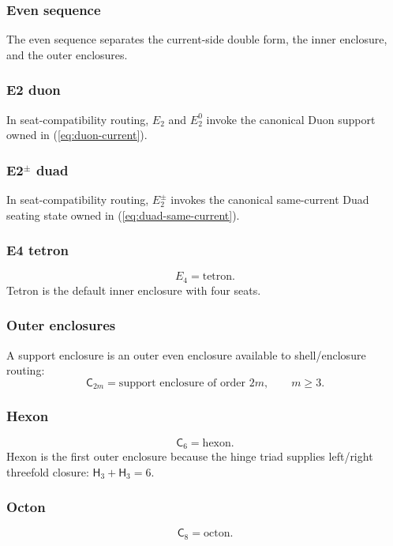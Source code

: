 \subsubsection{Even sequence}\label{subsec:support-enclosure-even-sequence}
The even sequence separates the current-side double form, the inner enclosure, and the outer enclosures.

\subsubsection{E2 duon}\label{subsec:e2-duon}
In seat-compatibility routing, \(E_2\) and \(E_2^0\) invoke the canonical Duon
support owned in  (\eqref{eq:duon-current}).

\subsubsection{E2\texorpdfstring{\(^{\pm}\)}{±} duad}\label{subsec:e2-duad}
In seat-compatibility routing, \(E_2^{\pm}\) invokes the canonical same-current
Duad seating state owned in  (\eqref{eq:duad-same-current}).

\subsubsection{E4 tetron}\label{subsec:e4-tetron}
\[
E_4=\mathrm{tetron}.
\]
Tetron is the default inner enclosure with four seats.

\subsubsection{Outer enclosures}\label{subsec:outer-enclosures}
A support enclosure is an outer even enclosure available to shell/enclosure routing:
\[
\mathsf C_{2m}=\text{support enclosure of order }2m,
\qquad m\ge3.
\]

\subsubsection{Hexon}\label{subsec:hexon}
\[
\mathsf C_6=\mathrm{hexon}.
\]
Hexon is the first outer enclosure because the hinge triad supplies left/right threefold closure: \(\mathsf H_3+\mathsf H_3=6\).

\subsubsection{Octon}\label{subsec:octon}
\[
\mathsf C_8=\mathrm{octon}.
\]

